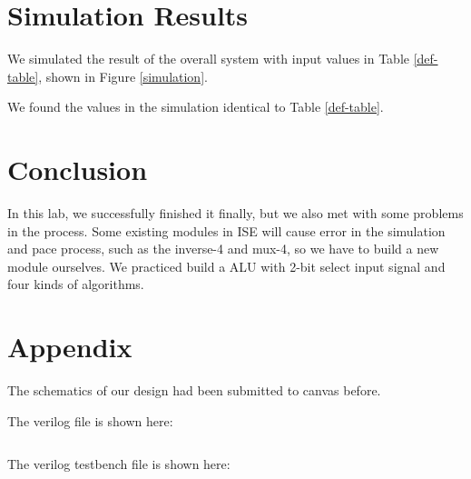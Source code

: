 \documentclass{article}
\begin{document}
\section{Simulation Results}
We simulated the result of the overall system with input values in Table \ref{def-table}, shown in Figure \ref{simulation}.


We found the values in the simulation identical to Table \ref{def-table}.



\section{Conclusion}
In this lab, we successfully finished it finally, but we also met with some problems in the process. Some existing modules in ISE will cause error in the simulation and pace process, such as the inverse-4 and mux-4, so we have to build a new module ourselves. We practiced build a ALU with 2-bit select input signal and four kinds of  algorithms.

\section{Appendix}
The schematics of our design had been submitted to canvas before.

The verilog file is shown here:
\inputminted{verilog}{../lab4/counter_verilog.v}

The verilog testbench file is shown here:
\inputminted{verilog}{../lab4/counter_test.v}
\end{document}
